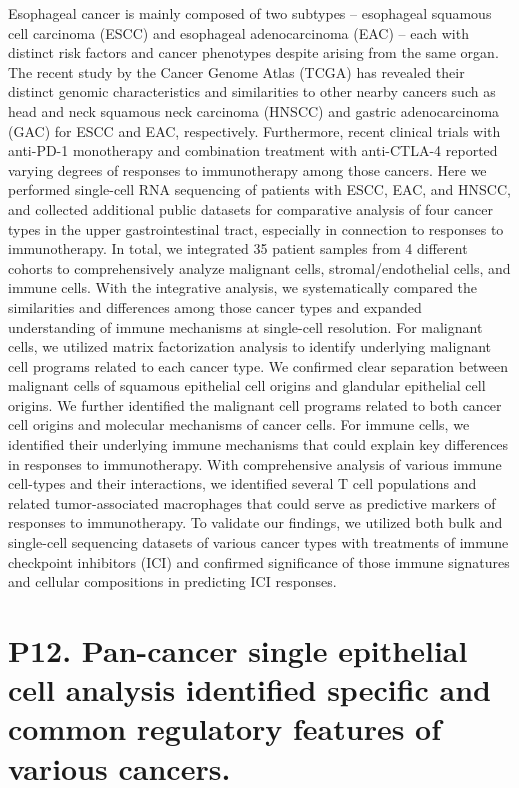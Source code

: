 \noindent
Esophageal cancer is mainly composed of two subtypes – esophageal squamous cell carcinoma (ESCC) and esophageal adenocarcinoma (EAC) – each with distinct risk factors and cancer phenotypes despite arising from the same organ. The recent study by the Cancer Genome Atlas (TCGA) has revealed their distinct genomic characteristics and similarities to other nearby cancers such as head and neck squamous neck carcinoma (HNSCC) and gastric adenocarcinoma (GAC) for ESCC and EAC, respectively. Furthermore, recent clinical trials with anti-PD-1 monotherapy and combination treatment with anti-CTLA-4 reported varying degrees of responses to immunotherapy among those cancers. Here we performed single-cell RNA sequencing of patients with ESCC, EAC, and HNSCC, and collected additional public datasets for comparative analysis of four cancer types in the upper gastrointestinal tract, especially in connection to responses to immunotherapy. In total, we integrated 35 patient samples from 4 different cohorts to comprehensively analyze malignant cells, stromal/endothelial cells, and immune cells. With the integrative analysis, we systematically compared the similarities and differences among those cancer types and expanded understanding of immune mechanisms at single-cell resolution. For malignant cells, we utilized matrix factorization analysis to identify underlying malignant cell programs related to each cancer type. We confirmed clear separation between malignant cells of squamous epithelial cell origins and glandular epithelial cell origins. We further identified the malignant cell programs related to both cancer cell origins and molecular mechanisms of cancer cells. For immune cells, we identified their underlying immune mechanisms that could explain key differences in responses to immunotherapy. With comprehensive analysis of various immune cell-types and their interactions, we identified several T cell populations and related tumor-associated macrophages that could serve as predictive markers of responses to immunotherapy. To validate our findings, we utilized both bulk and single-cell sequencing datasets of various cancer types with treatments of immune checkpoint inhibitors (ICI) and confirmed significance of those immune signatures and cellular compositions in predicting ICI responses.
\newpage

\section*{P12. Pan-cancer single epithelial cell analysis identified specific and common regulatory features of various cancers.}

